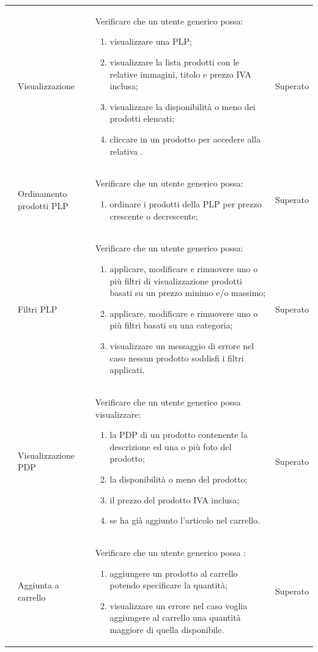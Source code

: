 \begin{center}
\begin{longtable}{|p{0.85cm}|p{2.25cm}|p{9cm}|p{3cm}|}
		 & Visualizzazione \glock{PLP} & Verificare che un utente generico possa: 
		\begin{enumerate}
			\item  visualizzare una PLP;
			\item  visualizzare la lista prodotti con le relative immagini, titolo e prezzo IVA inclusa;
			\item  visualizzare la disponibilità o meno dei prodotti elencati;
			\item  cliccare in un prodotto per accedere alla relativa \glock{PDP}.
		\end{enumerate} & Superato\\

		 & Ordinamento prodotti PLP & Verificare che un utente generico possa: 
		\begin{enumerate}
			\item  ordinare i prodotti della PLP per prezzo crescente o decrescente;
		\end{enumerate} & Superato \\

		 & Filtri PLP & Verificare che un utente generico possa: 
		\begin{enumerate}
			\item  applicare, modificare e rimuovere uno o più filtri di visualizzazione prodotti basati su un prezzo minimo e/o massimo;
			\item  applicare, modificare e rimuovere uno o più filtri basati su una categoria;
			\item  visualizzare un messaggio di errore nel caso nessun prodotto soddisfi i filtri applicati.
		\end{enumerate} & Superato\\

		 & Visualizzazione PDP & Verificare che un utente generico possa visualizzare: 
		\begin{enumerate}
			\item   la PDP di un prodotto contenente la descrizione ed una o più foto del prodotto;
			\item   la disponibilità o meno del prodotto;
			\item   il prezzo del prodotto IVA inclusa;
			\item   se ha già aggiunto l'articolo nel carrello.
		\end{enumerate} & Superato\\

		 & Aggiunta a carrello & Verificare che un utente generico possa : 
		\begin{enumerate}
			\item   aggiungere un prodotto al carrello potendo specificare la quantità;
			\item   visualizzare un errore nel caso voglia aggiungere al carrello una quantità maggiore di quella disponibile.
		\end{enumerate} & Superato\\


\end{longtable}
\end{center}

